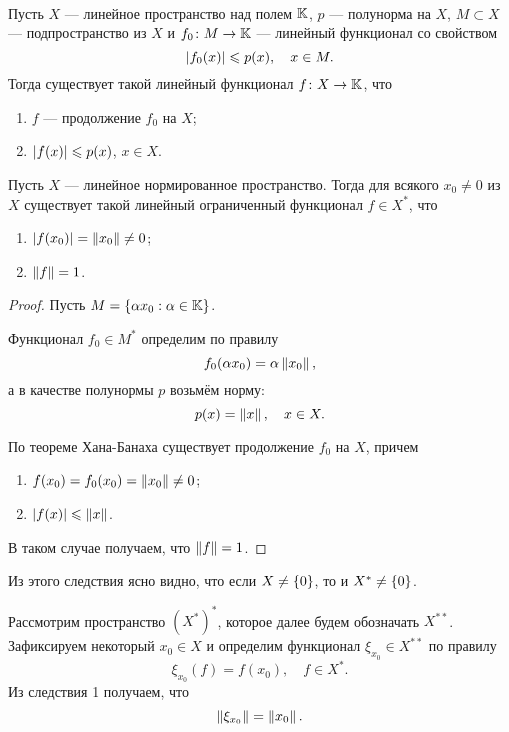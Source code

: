 \begin{theorem}\hfill\\
    \indent Пусть $X$ --- линейное пространство над полем $\mathbb{K}$, $p$ --- полунорма на $X$,
    $M \subset X$ --- подпространство из $X$ и $f_0 \colon M \to \mathbb{K}$ --- линейный
    функционал со свойством
    \[ \left|f_0(x)\right| \leqslant p(x), \quad x \in M. \]
    Тогда существует такой линейный функционал $f \colon X \to \mathbb{K}$, что
    \begin{enumerate}
        \item $f$ --- продолжение $f_0$ на $X$;
        \item $\left|f(x)\right| \leqslant p(x)$, $x \in X$.
    \end{enumerate}
\end{theorem}

\begin{corollaryth}
    Пусть $X$ --- линейное нормированное пространство. Тогда для всякого $x_0 \neq 0$ из $X$
    существует такой линейный ограниченный функционал $f \in X^*$, что
    \begin{enumerate}
        \item $\left|f(x_0)\right| = \left\|x_0\right\| \neq 0$;
        \item $\left\|f\right\| = 1$.
    \end{enumerate}
\end{corollaryth}

\begin{proof}
    Пусть $M = \left\{\alpha x_0 : \alpha \in \mathbb{K}\right\}$. 

    Функционал $f_0 \in M^*$ определим
    по правилу
    \[ f_0(\alpha x_0) = \alpha \left\|x_0\right\|, \]
    а в качестве полунормы $p$ возьмём норму:
    \[ p(x) = \left\|x\right\|, \quad x \in X. \]

    По теореме Хана-Банаха существует продолжение $f_0$ на $X$, причем
    \begin{enumerate}
        \item $f(x_0) = f_0(x_0) = \left\|x_0\right\| \neq 0$;
        \item $\left|f(x)\right| \leqslant \left\|x\right\|$.
    \end{enumerate}

    В таком случае получаем, что $\left\|f\right\| = 1$.
\end{proof}

Из этого следствия ясно видно, что если $X \neq \left\{0\right\}$, то и $X^* \neq \left\{0\right\}$.

Рассмотрим пространство $(X^*)^*$, которое далее будем обозначать $X^{**}$. 
Зафиксируем некоторый $x_0 \in X$ и определим функционал
$\xi_{x_0} \in X^{**}$ по правилу
\begin{equation}\label{eq:functional}
    \xi_{x_0}(f) = f(x_0), \quad f \in X^*.
\end{equation}
Из следствия 1 получаем, что
\[ \left\|\xi_{x_0}\right\| = \left\|x_0\right\|. \]

